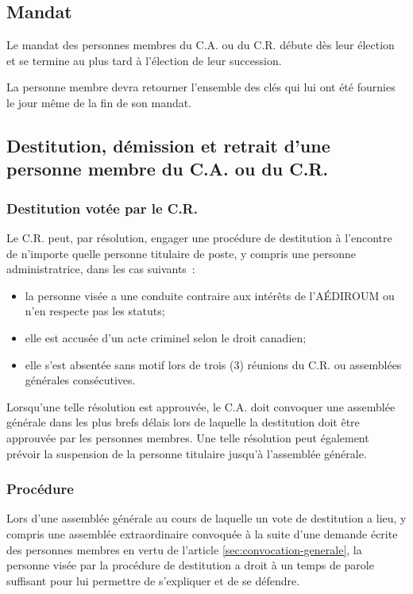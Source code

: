 \documentclass{aediroum}
\newcommand{\article}[1]{article \ref{#1}}
\begin{document}
\subsection{Mandat}\label{sec:mandat}
Le mandat des personnes membres du C.A. ou du C.R. débute dès leur élection et se termine au plus tard à l'élection de leur succession.

La personne membre devra retourner l'ensemble des clés qui lui ont été fournies le jour même de la fin de son mandat.

\subsection{Destitution, démission et retrait d'une personne membre du C.A. ou du C.R.}\label{sec:destitution-demission-retrait-exec-admin}
\subsubsection{Destitution votée par le C.R.}\label{sec:destitution}

Le C.R. peut, par résolution, engager une procédure de destitution à l'encontre de n'importe quelle personne titulaire de poste, y compris une personne administratrice, dans les cas suivants~:
\begin{itemize}
    \item la personne visée a une conduite contraire aux intérêts de l'AÉDIROUM ou n'en respecte pas les statuts;
    \item elle est accusée d'un acte criminel selon le droit canadien;
    \item elle s'est absentée sans motif lors de trois (3) réunions du C.R. ou assemblées générales consécutives.
\end{itemize}

Lorsqu'une telle résolution est approuvée, le C.A. doit convoquer une assemblée générale dans les plus brefs délais lors de laquelle la destitution doit être approuvée par les personnes membres. Une telle résolution peut également prévoir la suspension de la personne titulaire jusqu'à l'assemblée générale.

\subsubsection{Procédure}\label{sec:destitution-procedure}

Lors d'une assemblée générale au cours de laquelle un vote de destitution a lieu, y compris une assemblée extraordinaire convoquée à la suite d'une demande écrite des personnes membres en vertu de l'\article{sec:convocation-generale}, la personne visée par la procédure de destitution a droit à un temps de parole suffisant pour lui permettre de s'expliquer et de se défendre.
\end{document}
